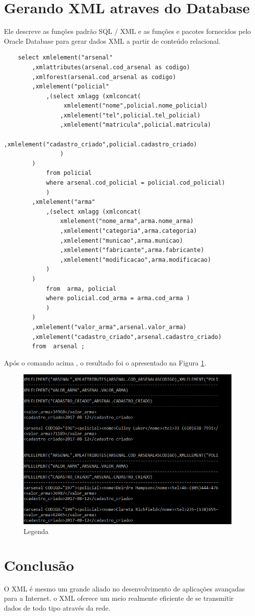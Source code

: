 \documentclass[12pt]{article}
\begin{document}
\section{Gerando XML atraves do Database}
	Ele descreve as funções padrão SQL / XML e as funções e pacotes fornecidos pelo Oracle Database para gerar dados XML a partir de conteúdo relacional. \cite{geracao}
	
	\begin{verbatim}
	select xmlelement("arsenal"
		,xmlattributes(arsenal.cod_arsenal as codigo)
		,xmlforest(arsenal.cod_arsenal as codigo)
		,xmlelement("policial"
			,(select xmlagg (xmlconcat(
				 xmlelement("nome",policial.nome_policial)
				,xmlelement("tel",policial.tel_policial)
				,xmlelement("matricula",policial.matricula)
				,xmlelement("cadastro_criado",policial.cadastro_criado)
				)
		)
			from policial 
			where arsenal.cod_policial = policial.cod_policial)
			)
		,xmlelement("arma"
			,(select xmlagg (xmlconcat(
				xmlelement("nome_arma",arma.nome_arma)
				,xmlelement("categoria",arma.categoria)
				,xmlelement("municao",arma.municao)
				,xmlelement("fabricante",arma.fabricante)
				,xmlelement("modificacao",arma.modificacao)
			)
		)
			from  arma, policial
			where policial.cod_arma = arma.cod_arma )
			)
		)
		,xmlelement("valor_arma",arsenal.valor_arma)
		,xmlelement("cadastro_criado",arsenal.cadastro_criado)     
		from  arsenal ;
	\end{verbatim}
Após o comando acima , o resultado foi o apresentado na Figura \ref{fg2}.
	\begin{figure}[H]
		\centering
		\includegraphics[scale=0.5]{./imagens/f2.png}
		\caption{Legenda}
		\label{fg2}
	\end{figure}
\section{Conclusão}
O XML é mesmo um grande aliado no desenvolvimento de aplicações avançadas para a Internet. o XML oferece um meio realmente eficiente de se transmitir dados de todo tipo através da rede.
	


\end{document}
